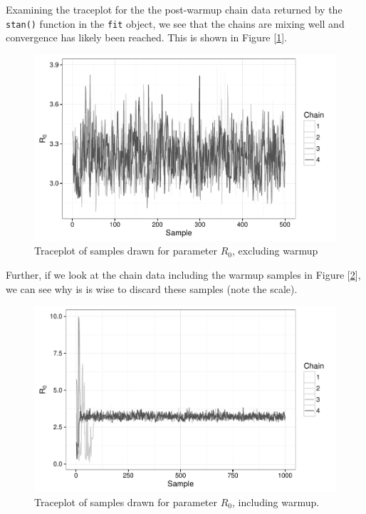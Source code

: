     Examining the traceplot for the the post-warmup chain data returned by the \verb|stan()| function in the \verb|fit| object, we see that the chains are mixing well and convergence has likely been reached. This is shown in Figure [\ref{traceplot}].

    \begin{figure}
        \centering
        \captionsetup{width=0.8\linewidth}
        \includegraphics[width=\textwidth]{./images/traceplotR0.pdf}
        \caption{Traceplot of samples drawn for parameter $R_0$, excluding warmup \label{traceplot}}
    \end{figure}

    Further, if we look at the chain data including the warmup samples in Figure [\ref{traceplot2}], we can see why is is wise to discard these samples (note the scale).

    \begin{figure}
        \centering
        \captionsetup{width=0.8\linewidth}
        \includegraphics[width=\textwidth]{./images/traceplotR0_inc.pdf}
        \caption{Traceplot of samples drawn for parameter $R_0$, including warmup. \label{traceplot2}}
    \end{figure}

